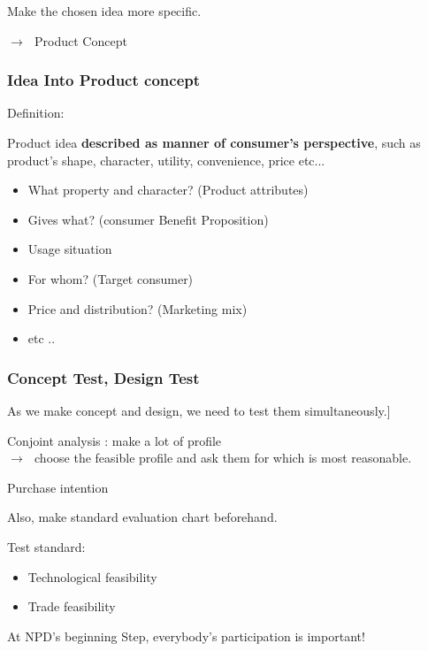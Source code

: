 \documentclass[12pt]{article}
\newcommand{\ra}{$\rightarrow \text{ }$}
\newcommand{\tb}{\textbf}
\newcommand{\sk}{\smallskip}
\begin{document}
\begin{center}{
	\large Make the chosen idea more specific.

	\sk

	\ra Product Concept
	}

\end{center}


\subsubsection{Idea Into Product concept}
Definition:
\begin{tcolorbox}
	Product idea \tb{described as manner of consumer's perspective}, such as
	product's shape, character, utility, convenience, price etc...

\end{tcolorbox}

\begin{itemize}
	\item What property and character? (Product attributes)
	\item Gives what? (consumer Benefit Proposition)
	\item Usage situation
	\item For whom? (Target consumer)
	\item Price and distribution? (Marketing mix)
	\item etc ..
\end{itemize}

\subsubsection{Concept Test, Design Test}

As we make concept and design, we need to test them simultaneously.]\

\sk

Conjoint analysis : make a lot of profile \\
\ra choose the feasible profile and ask them for which is most reasonable.


Purchase intention

Also, make standard evaluation chart beforehand.

Test standard:
\begin{itemize}
	\item Technological feasibility
	\item Trade feasibility
\end{itemize}

At NPD's beginning Step, everybody's participation is important!
\end{document}
